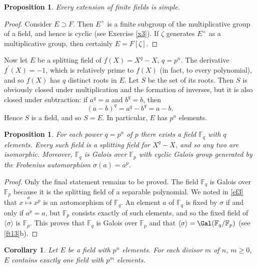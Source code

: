 \documentclass[a4paper,11pt,final,openany]{memoir}
\newtheorem{corollary}[X]{Corollary}
\newtheorem{proposition}[X]{Proposition}
\theoremstyle{nonumberplain}
\newtheorem{proof}{Proof.}
\begin{document}
\begin{proposition}
\label{cg17}Every extension of finite fields is simple.
\end{proposition}

\begin{proof}
Consider $E\supset F$. Then $E^{\times}$ is a finite subgroup of the
multiplicative group of a field, and hence is cyclic (see Exercise \ref{x3}).
If $\zeta$ generates $E^{\times}$ as a multiplicative group, then certainly
$E=F[\zeta]$.
\end{proof}

Now let $E$ be a splitting field of $f(X)=X^{q}-X$, $q=p^{n}$. The derivative
$f^{\prime}(X)=-1$, which is relatively prime to $f(X)$ (in fact, to every
polynomial), and so $f(X)$ has $q$ distinct roots in $E$. Let $S$ be the set
of its roots. Then $S$ is obviously closed under multiplication and the
formation of inverses, but it is also closed under subtraction: if $a^{q}=a$
and $b^{q}=b$, then
\[
(a-b)^{q}=a^{q}-b^{q}=a-b.
\]
Hence $S$ is a field, and so $S=E$. In particular, $E$ has $p^{n}$ elements.

\begin{proposition}
\label{cg15}For each power $q=p^{n}$ of $p$ there exists a field
$\mathbb{F}_{q}$ with $q$ elements. Every such field is a splitting field for
$X^{q}-X$, and so any two are isomorphic. Moreover, $\mathbb{F}_{q}$ is Galois
over $\mathbb{F}_{p}$ with cyclic Galois group generated by the Frobenius
automorphism $\sigma(a)=a^{p}$.
\end{proposition}

\begin{proof}
Only the final statement remains to be proved. The field $\mathbb{F}_{q}$ is
Galois over $\mathbb{F}_{p}$ because it is the splitting field of a separable
polynomial. We noted in \ref{ef3} that $x\overset{\sigma}{\mapsto}x^{p}$ is an
automorphism of $\mathbb{F}_{q}$. An element $a$ of $\mathbb{F}_{q}$ is fixed
by $\sigma$ if and only if $a^{p}=a$, but $\mathbb{F}_{p}$ consists exactly of
such elements, and so the fixed field of $\langle{}\sigma\rangle$ is
$\mathbb{F}_{p}$. This proves that $\mathbb{F}_{q}$ is Galois over
$\mathbb{F}_{p}$ and that $\langle{}\sigma\rangle=\Gal(\mathbb{F}%
_{q}/\mathbb{F}_{p})$ (see \ref{ft13}b).
\end{proof}

\begin{corollary}
\label{cg16}Let $E$ be a field with $p^{n}$ elements. For each divisor $m$ of
$n$, $m\geq0$, $E$ contains exactly one field with $p^{m}$ elements.
\end{corollary}
\end{document}
